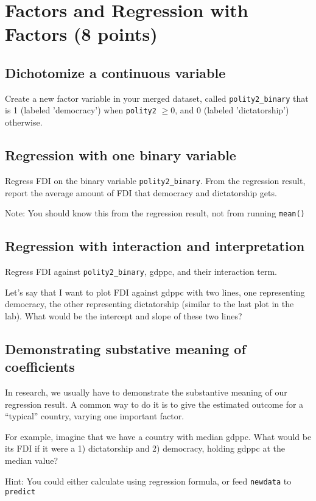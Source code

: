 \documentclass{article}\usepackage[]{graphicx}\usepackage[]{color}
\begin{document}
\section{Factors and Regression with Factors (8 points)}

\subsection{Dichotomize a continuous variable}

Create a new factor variable in your merged dataset, called \verb`polity2_binary` that is 1 (labeled 'democracy') when \verb`polity2` $\geq 0$, and 0 (labeled 'dictatorship') otherwise.

\subsection{Regression with one binary variable}

Regress FDI on the binary variable \verb`polity2_binary`. From the regression result, report the average amount of FDI that democracy and dictatorship gets.

Note: You should know this from the regression result, not from running \verb`mean()`

\subsection{Regression with interaction and interpretation}

Regress FDI against \verb`polity2_binary`, gdppc, and their interaction term.

Let's say that I want to plot FDI against gdppc with two lines, one representing democracy, the other representing dictatorship (similar to the last plot in the lab). What would be the intercept and slope of these two lines?

\subsection{Demonstrating substative meaning of coefficients}

In research, we usually have to demonstrate the substantive meaning of our regression result. A common way to do it is to give the estimated outcome for a ``typical'' country, varying one important factor.

For example, imagine that we have a country with median gdppc. What would be its FDI if it were a 1) dictatorship and 2) democracy, holding gdppc at the median value?

Hint: You could either calculate using regression formula, or feed \verb`newdata` to \verb`predict`
\end{document}

